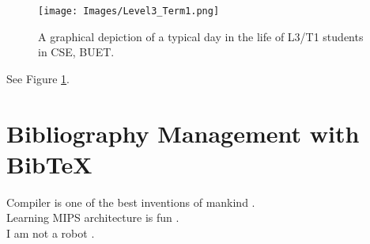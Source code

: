 \documentclass[12pt]{article}
\begin{document}
    \pagebreak
    
    \begin{figure}
        \centering
        \texttt{[image: Images/Level3\_Term1.png]}
        \caption{A graphical depiction of a typical day in the life of L3/T1 students in CSE, BUET.}
        \label{fig:l3t1}
    \end{figure}
    
    See Figure \ref{fig:l3t1}.
    
    \section*{Bibliography Management with BibTeX}
    Compiler is one of the best inventions of mankind \cite{dragonbook}. \\
    
    Learning MIPS architecture is fun \cite{mips}. \\
    
    \noindent I am not a robot \cite{turing2009computing}.
    
    
    
\end{document}
